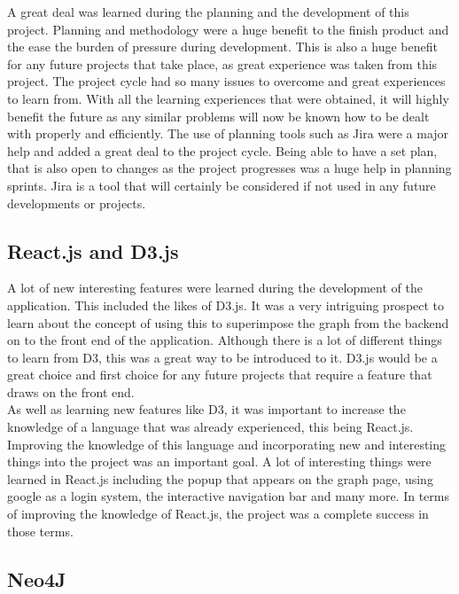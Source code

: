 A great deal was learned during the planning and the development of this project. Planning and methodology were a huge benefit to the finish product and the ease the burden of pressure during development. This is also a huge benefit for any future projects that take place, as great experience was taken from this project. The project cycle had so many issues to overcome and great experiences to learn from. With all the learning experiences that were obtained, it will highly benefit the future as any similar problems will now be known how to be dealt with properly and efficiently. The use of planning tools such as Jira were a major help and added a great deal to the project cycle. Being able to have a set plan, that is also open to changes as the project progresses was a huge help in planning sprints. Jira is a tool that will certainly be considered if not used in any future developments or projects. \\

\subsection{React.js and D3.js}

A lot of new interesting features were learned during the development of the application. This included the likes of D3.js. It was a very intriguing prospect to learn about the concept of using this to superimpose the graph from the backend on to the front end of the application. Although there is a lot of different things to learn from D3, this was a great way to be introduced to it. D3.js would be a great choice and first choice for any future projects that require a feature that draws on the front end. \\

As well as learning new features like D3, it was important to increase the knowledge of a language that was already experienced, this being React.js. Improving the knowledge of this language and incorporating new and interesting things into the project was an important goal. A lot of interesting things were learned in React.js including the popup that appears on the graph page, using google as a login system, the interactive navigation bar and many more. In terms of improving the knowledge of React.js, the project was a complete success in those terms. \\

\subsection{Neo4J}

